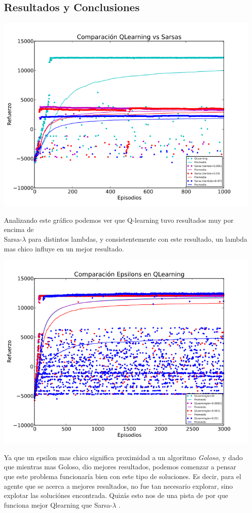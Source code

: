 \documentclass[11pt, a4paper]{article}
\newcommand{\slambda}{Sarsa-$\lambda$ }
\begin{document}
\subsection{Resultados y Conclusiones}
\includegraphics[scale=0.6]{Graf1}

Analizando este gr\'afico podemos ver que Q-learning tuvo resultados muy por encima de\\ \slambda para distintos lambdas, y consistentemente con este resultado, un lambda mas chico influye en un mejor resultado.

\includegraphics[scale=0.6]{Graf2}

Ya que un epsilon mas chico significa proximidad a un algoritmo \textit{Goloso}, y dado que mientras mas Goloso, dio mejores resultados, podemos comenzar a pensar que este problema funcionar\'ia bien con este tipo de soluciones. 
Es decir, para el agente que se acerca a mejores resultados, no fue tan necesario explorar, sino explotar las soluci\'ones encontrada. Quiz\'as esto nos de una pista de por que funciona mejor Qlearning que \slambda.
\end{document}
